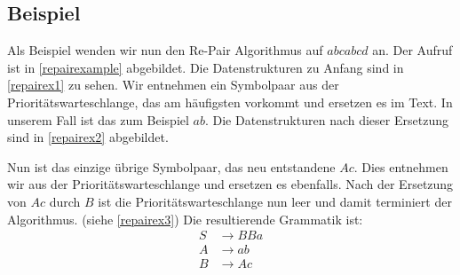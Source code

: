 \subsection{Beispiel}

Als Beispiel wenden wir nun den Re-Pair Algorithmus auf $abcabcd$ an. Der Aufruf ist in \autoref{repairexample} abgebildet. Die Datenstrukturen zu Anfang sind in \autoref{repairex1} zu sehen.
Wir entnehmen ein Symbolpaar aus der Prioritätswarteschlange, das am häufigsten vorkommt und ersetzen es im Text. In unserem Fall ist das zum Beispiel $ab$. Die Datenstrukturen nach dieser Ersetzung sind in \autoref{repairex2} abgebildet.

Nun ist das einzige übrige Symbolpaar, das neu entstandene $Ac$. Dies entnehmen wir aus der Prioritätswarteschlange und ersetzen es ebenfalls.
Nach der Ersetzung von $Ac$ durch $B$ ist die Prioritätswarteschlange nun leer und damit terminiert der Algorithmus. (siehe \autoref{repairex3}) Die resultierende Grammatik ist:
\begin{align*}
	S &\rightarrow BBa\\
	A &\rightarrow ab\\
	B &\rightarrow Ac
\end{align*}